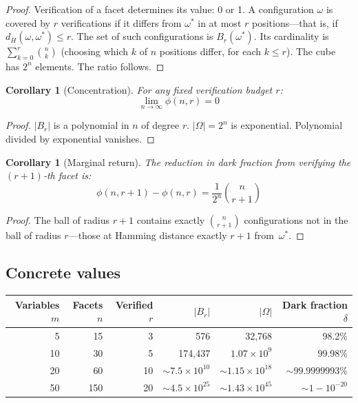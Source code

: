 \documentclass[11pt,a4paper]{article}
\newtheorem{corollary}[theorem]{Corollary}
\begin{document}
\begin{proof}
Verification of a facet determines its value: 0 or 1. A configuration $\omega$ is covered by $r$ verifications if it differs from $\omega^*$ in at most $r$ positions---that is, if $d_H(\omega, \omega^*) \leq r$. The set of such configurations is $B_r(\omega^*)$. Its cardinality is $\sum_{k=0}^{r}\binom{n}{k}$ (choosing which $k$ of $n$ positions differ, for each $k \leq r$). The cube has $2^n$ elements. The ratio follows.
\end{proof}

\begin{corollary}[Concentration]
\label{cor:conc}
For any fixed verification budget $r$:
\[
\lim_{n \to \infty} \phi(n, r) = 0
\]
\end{corollary}

\begin{proof}
$|B_r|$ is a polynomial in $n$ of degree $r$. $|\Omega| = 2^n$ is exponential. Polynomial divided by exponential vanishes.
\end{proof}

\begin{corollary}[Marginal return]
\label{cor:marginal}
The reduction in dark fraction from verifying the $(r+1)$-th facet is:
\[
\phi(n, r+1) - \phi(n, r) = \frac{1}{2^n}\binom{n}{r+1}
\]
\end{corollary}

\begin{proof}
The ball of radius $r+1$ contains exactly $\binom{n}{r+1}$ configurations not in the ball of radius $r$---those at Hamming distance exactly $r+1$ from~$\omega^*$.
\end{proof}

\subsection{Concrete values}

\begin{center}
\begin{tabular}{@{}rrrrrr@{}}
\toprule
Variables $m$ & Facets $n$ & Verified $r$ & $|B_r|$ & $|\Omega|$ & Dark fraction $\delta$ \\
\midrule
5 & 15 & 3 & 576 & 32{,}768 & 98.2\% \\
10 & 30 & 5 & 174{,}437 & $1.07 \times 10^9$ & 99.98\% \\
20 & 60 & 10 & ${\sim}7.5 \times 10^{10}$ & ${\sim}1.15 \times 10^{18}$ & ${\sim}99.9999993\%$ \\
50 & 150 & 20 & ${\sim}4.5 \times 10^{25}$ & ${\sim}1.43 \times 10^{45}$ & ${\sim}1 - 10^{-20}$ \\
\bottomrule
\end{tabular}
\end{center}
\end{document}
